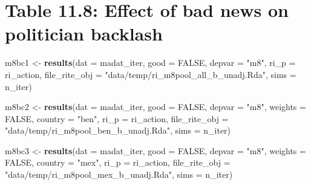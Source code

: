 \documentclass[]{article}
\newenvironment{Shaded}{\begin{snugshade}}{\end{snugshade}}
\newcommand{\KeywordTok}[1]{\textcolor[rgb]{0.13,0.29,0.53}{\textbf{#1}}}
\newcommand{\DataTypeTok}[1]{\textcolor[rgb]{0.13,0.29,0.53}{#1}}
\newcommand{\StringTok}[1]{\textcolor[rgb]{0.31,0.60,0.02}{#1}}
\newcommand{\OtherTok}[1]{\textcolor[rgb]{0.56,0.35,0.01}{#1}}
\newcommand{\NormalTok}[1]{#1}
\begin{document}
\section{Table 11.8: Effect of bad news on politician
backlash}\label{table-11.8-effect-of-bad-news-on-politician-backlash}

\begin{Shaded}
\begin{Highlighting}[]
\NormalTok{m8bc1 <-}\StringTok{ }\KeywordTok{results}\NormalTok{(}\DataTypeTok{dat =}\NormalTok{ madat_iter, }\DataTypeTok{good =} \OtherTok{FALSE}\NormalTok{, }\DataTypeTok{depvar =} \StringTok{"m8"}\NormalTok{,}
                 \DataTypeTok{ri_p =}\NormalTok{ ri_action, }\DataTypeTok{file_rite_obj =} \StringTok{"data/temp/ri_m8pool_all_b_unadj.Rda"}\NormalTok{, }\DataTypeTok{sims =}\NormalTok{ n_iter)}

\NormalTok{m8bc2 <-}\StringTok{ }\KeywordTok{results}\NormalTok{(}\DataTypeTok{dat =}\NormalTok{ madat_iter, }\DataTypeTok{good =} \OtherTok{FALSE}\NormalTok{, }\DataTypeTok{depvar =} \StringTok{"m8"}\NormalTok{, }\DataTypeTok{weights =} \OtherTok{FALSE}\NormalTok{, }\DataTypeTok{country =} \StringTok{"ben"}\NormalTok{,}
                 \DataTypeTok{ri_p =}\NormalTok{ ri_action, }\DataTypeTok{file_rite_obj =} \StringTok{"data/temp/ri_m8pool_ben_b_unadj.Rda"}\NormalTok{, }\DataTypeTok{sims =}\NormalTok{ n_iter)}

\NormalTok{m8bc3 <-}\StringTok{ }\KeywordTok{results}\NormalTok{(}\DataTypeTok{dat =}\NormalTok{ madat_iter, }\DataTypeTok{good =} \OtherTok{FALSE}\NormalTok{, }\DataTypeTok{depvar =} \StringTok{"m8"}\NormalTok{, }\DataTypeTok{weights =} \OtherTok{FALSE}\NormalTok{, }\DataTypeTok{country =} \StringTok{"mex"}\NormalTok{,}
                 \DataTypeTok{ri_p =}\NormalTok{ ri_action, }\DataTypeTok{file_rite_obj =} \StringTok{"data/temp/ri_m8pool_mex_b_unadj.Rda"}\NormalTok{, }\DataTypeTok{sims =}\NormalTok{ n_iter)}
\end{Highlighting}
\end{Shaded}
\end{document}

